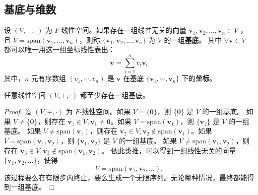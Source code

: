 \subsection{基底与维数}
\begin{definition}
    设 $ (V,+,\cdot) $ 为 $ F $-线性空间。如果存在一组线性无关的向量 $ \mathbf{v}_1,\mathbf{v}_2,\ldots,\mathbf{v}_n\in V $ ，
    且 $ V=\mathrm{span}(\mathbf{v}_1,\ldots,\mathbf{v}_n) $，则称 $ \{\mathbf{v}_1,\mathbf{v}_2,\ldots,\mathbf{v}_n\} $ 为 $ V $ 的一组\textbf{基底}。
    其中 $\forall \mathbf{v}\in V$ 都可以唯一用这一组坐标线性表出：
    \[
        \mathbf{v} = \sum_{i=1}^{n} v_i \mathbf{v}_i
    \]
    其中，$n$ 元有序数组 $(v_1,\cdots,v_n)$ 是 $\mathbf{v}$ 在基底 $\{\mathbf{v}_1,\cdots,\mathbf{v}_n\}$ 下的\textbf{坐标}。
    \label{def:basis}
\end{definition}

\begin{proposition}
    任意线性空间 $ (V,+,\cdot) $ 都至少存在一组基底。
\end{proposition}
\begin{proof}
    设 $ (V,+,\cdot) $ 为 $ F $-线性空间。如果 $ V=\{\mathbf{0}\} $，则 $\{\mathbf{0}\}$ 是 $ V $ 的一组基底。
    如果 $ V\neq \{\mathbf{0}\} $，则存在 $ \mathbf{v}_1\in V, \mathbf{v}_1\neq \mathbf{0} $。如果 $ V=\mathrm{span}(\mathbf{v}_1) $，则 $\{\mathbf{v}_1\}$ 是 $ V $ 的一组基底。
    如果 $ V\neq \mathrm{span}(\mathbf{v}_1) $，则存在 $ \mathbf{v}_2\in V, \mathbf{v}_2\notin \mathrm{span}(\mathbf{v}_1) $。如果 $ V=\mathrm{span}(\mathbf{v}_1,\mathbf{v}_2) $，则 $\{\mathbf{v}_1,\mathbf{v}_2\}$ 是 $ V $ 的一组基底。
    如果 $ V\neq \mathrm{span}(\mathbf{v}_1,\mathbf{v}_2) $，则存在 $ \mathbf{v}_3\in V, \mathbf{v}_3\notin \mathrm{span}(\mathbf{v}_1,\mathbf{v}_2) $。
    依此类推，可以得到一组线性无关的向量 $\{\mathbf{v}_1,\mathbf{v}_2,\ldots\}$，使得
    \[
        V = \mathrm{span}(\mathbf{v}_1,\mathbf{v}_2,\ldots).
    \]
    该过程要么在有限步内终止，要么生成一个无限序列。无论哪种情况，最终都能得到一组基底。
\end{proof}

